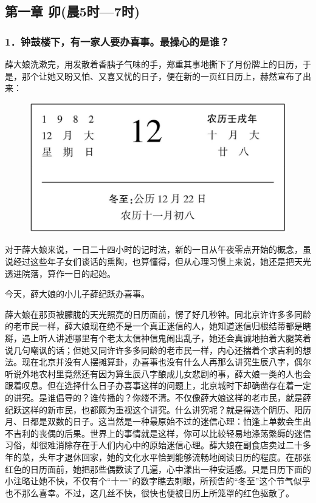 \subsection*{第一章 卯(晨5时—7时)}


\subsubsection*{1．钟鼓楼下，有一家人要办喜事。最操心的是谁？}

\par 薛大娘洗漱完，用发散着香胰子气味的手，郑重其事地撕下了月份牌上的日历，于是，那个让她又盼又怕、又喜又忧的日子，便在新的一页红日历上，赫然宣布了出来：
\begin{figure}[htb]
    \centering
    \includegraphics[scale=0.4]{picture/钟鼓楼1.jpeg}
\end{figure}
\par 对于薛大娘来说，一日二十四小时的记时法，新的一日从午夜零点开始的概念，虽说经过这些年子女们谈话的熏陶，也算懂得，但从心理习惯上来说，她还是把天光透进院落，算作一日的起始。
\par 今天，薛大娘的小儿子薛纪跃办喜事。
\par 薛大娘在那页被朦胧的天光照亮的日历面前，愣了好几秒钟。同北京许许多多同龄的老市民一样，薛大娘现在绝不是一个真正迷信的人，她知道迷信归根结蒂都是瞎掰，遇上听人讲述哪里有个老太太信神信鬼闹出乱子，她还会真诚地拍着大腿笑着说几句嘲讽的话；但她又同许许多多同龄的老市民一样，内心还揣着个求吉利的想法。现在北京并没有人摆摊算卦，办喜事也没有什么人再那么讲究生辰八字，偶尔听说外地农村里竟然还有因为算生辰八字酿成儿女悲剧的事，薛大娘一类的人也会跟着叹息。但在选择什么日子办喜事这样的问题上，北京城时下却确凿存在着一定的讲究。是谁倡导的？谁传播的？你缕不清。不仅像薛大娘这样的老市民，就是薛纪跃这样的新市民，也都颇为重视这个讲究。什么讲究呢？就是得选个阴历、阳历月、日都是双数的日子。这当然是一种最原始不过的迷信心理：怕逢上单数会生出不吉利的丧偶的后果。世界上的事情就是这样，你可以比较轻易地涤荡繁缛的迷信习俗，却很难消除存在于人们内心中的原始迷信心理。薛大娘在副食店卖过二十多年的菜，头年才退休回家，她的文化水平恰到能够流畅地阅读日历的程度。在那张红色的日历面前，她把那些偶数读了几遍，心中漾出一种安适感。只是日历下面的小注略让她不快，不仅有个“十一”的数字瞧去刺眼，所预告的“冬至”这个节气似乎也不那么喜幸。不过，这几丝不快，很快也便被日历上所笼罩的红色驱散了。
